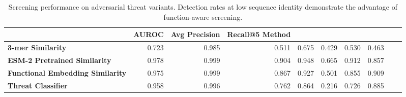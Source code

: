 \begin{table}
\caption{Screening performance on adversarial threat variants. Detection rates at low sequence identity demonstrate the advantage of function-aware screening.}
\label{tab:main_results}
\begin{tabular}{lrrrrrrr}
\toprule
 & AUROC & Avg Precision & Recall@5%
Method &  &  &  &  &  &  &  \\
\midrule
\textbf{3-mer Similarity} & 0.723 & 0.985 & 0.511 & 0.675 & 0.429 & 0.530 & 0.463 \\
\textbf{ESM-2 Pretrained Similarity} & 0.978 & 0.999 & 0.904 & 0.948 & 0.665 & 0.912 & 0.857 \\
\textbf{Functional Embedding Similarity} & 0.975 & 0.999 & 0.867 & 0.927 & 0.501 & 0.855 & 0.909 \\
\textbf{Threat Classifier} & 0.958 & 0.996 & 0.762 & 0.864 & 0.216 & 0.726 & 0.885 \\
\bottomrule
\end{tabular}
\end{table}
